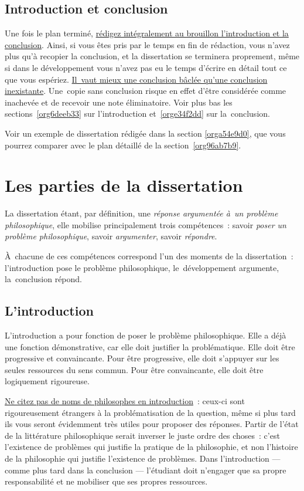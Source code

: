 \documentclass[a4paper,12pt]{report}
\begin{document}
\chapter{Introduction et conclusion}
\label{sec:org08f3dc3}

Une fois le plan terminé, \uline{rédigez intégralement au brouillon
l'introduction et la conclusion}​. Ainsi, si vous êtes pris par le temps
en fin de rédaction, vous n'avez plus qu'à recopier la conclusion, et la
dissertation se terminera proprement, même si dans le développement vous
n'avez pas eu le temps d'écrire en détail tout ce que vous espériez.
\uline{Il vaut mieux une conclusion bâclée qu'une conclusion inexistante}.
Une copie sans conclusion risque en effet d'être considérée comme
inachevée et de recevoir une note éliminatoire. Voir plus bas les
sections \ref{org6deeb33} sur l'introduction et \ref{orge34f2dd} sur
la conclusion.

Voir un exemple de dissertation rédigée dans la section \ref{orga54e9d0}, que
vous pourrez comparer avec le plan détaillé de la section \ref{org96ab7b9}.

\part{Les parties de la dissertation}
\label{sec:org8560eb7}

La dissertation étant, par définition, une \emph{réponse argumentée à un
problème philosophique}, elle mobilise principalement trois
compétences : savoir \emph{poser un problème philosophique}, savoir
\emph{argumenter}, savoir \emph{répondre}.

À chacune de ces compétences correspond l'un des moments de la
dissertation : l'introduction pose le problème philosophique,
le développement argumente, la conclusion répond.


\chapter{L'introduction}
\label{sec:orgc1a0397}
\label{org6deeb33}

L'introduction a pour fonction de poser le problème philosophique. Elle
a déjà une fonction démonstrative, car elle doit justifier la
problématique. Elle doit être progressive et convaincante. Pour être
progressive, elle doit s'appuyer sur les seules ressources du sens
commun. Pour être convaincante, elle doit être logiquement rigoureuse.

\uline{Ne citez pas de noms de philosophes en introduction} : ceux-ci sont
rigoureusement étrangers à la problématisation de la question, même si
plus tard ils vous seront évidemment très utiles pour proposer des
réponses. Partir de l'état de la littérature philosophique serait
inverser le juste ordre des choses : c'est l'existence de problèmes qui
justifie la pratique de la philosophie, et non l'histoire de la
philosophie qui justifie l'existence de problèmes. Dans l'introduction
--- comme plus tard dans la conclusion --- l'étudiant doit n'engager que
sa propre responsabilité et ne mobiliser que ses propres ressources.
\end{document}
